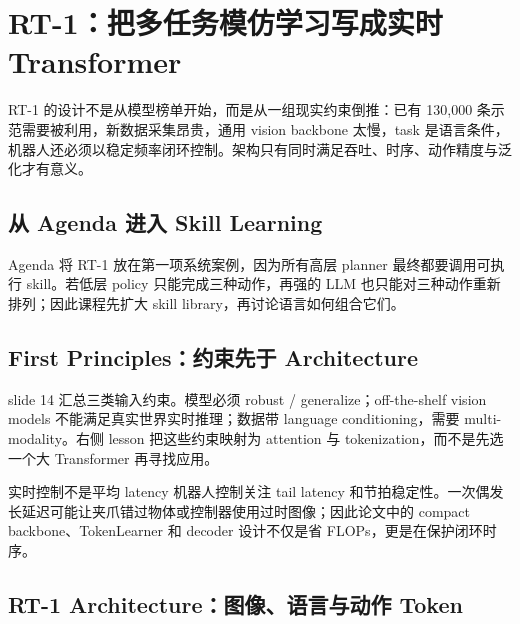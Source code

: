 \section{RT-1：把多任务模仿学习写成实时 Transformer}

RT-1 的设计不是从模型榜单开始，而是从一组现实约束倒推：已有 130,000 条示范需要被利用，新数据采集昂贵，通用 vision backbone 太慢，task 是语言条件，机器人还必须以稳定频率闭环控制。架构只有同时满足吞吐、时序、动作精度与泛化才有意义。

\subsection{从 Agenda 进入 Skill Learning}

Agenda 将 RT-1 放在第一项系统案例，因为所有高层 planner 最终都要调用可执行 skill。若低层 policy 只能完成三种动作，再强的 LLM 也只能对三种动作重新排列；因此课程先扩大 skill library，再讨论语言如何组合它们。


\subsection{First Principles：约束先于 Architecture}

slide 14 汇总三类输入约束。模型必须 robust / generalize；off-the-shelf vision models 不能满足真实世界实时推理；数据带 language conditioning，需要 multi-modality。右侧 lesson 把这些约束映射为 attention 与 tokenization，而不是先选一个大 Transformer 再寻找应用。


\begin{warningbox}{实时控制不是平均 latency}
机器人控制关注 tail latency 和节拍稳定性。一次偶发长延迟可能让夹爪错过物体或控制器使用过时图像；因此论文中的 compact backbone、TokenLearner 和 decoder 设计不仅是省 FLOPs，更是在保护闭环时序。
\end{warningbox}

\subsection{RT-1 Architecture：图像、语言与动作 Token}

